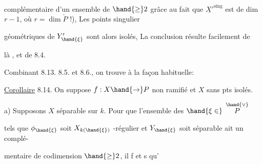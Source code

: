 complémentaire d'un ensemble de  $\hand{\geq} 2$ grâce au fait que $\underline{X'}^{\text{sing}}$ est de dim $r-1$, où $r=\dim \check{P}$ !), Les points singulier

géométriques de $Y'_{\hand{\xi}}$ sont alors isolés, La conclusion résulte facilement de

là , et de 8.4. 

Combinant 8.13.  8.5. et 8.6., on trouve à la façon habituelle:

\uline{Corollaire} 8.14. On suppose $f:X\hand{\rightarrow} P$ non ramifié et $X$ sans pts isolés.

 a) Supposons $X$ séparable sur $k$. Pour que l'ensemble  des $\hand{\xi \in}$ $\overset{\hand{\vee}}{P}$

tels que $\phi_{\hand{\xi}}$ soit $X_{k(\hand{\xi})}$ -régulier et $Y_{\hand{\xi}}$ soit séparable ait un complé-%

mentaire de codimension $\hand{\geq} 2$, il f et s qu'

